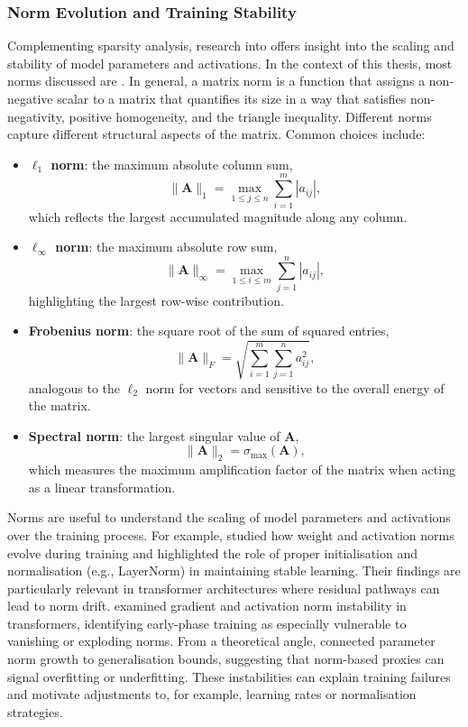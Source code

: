 \subsubsection{Norm Evolution and Training Stability}

Complementing sparsity analysis, research into  offers insight into the scaling and stability of model parameters and activations. In the context of this thesis, most norms discussed are . In general, a matrix norm is a function that assigns a non-negative scalar to a matrix that quantifies its size in a way that satisfies non-negativity, positive homogeneity, and the triangle inequality. Different norms capture different structural aspects of the matrix. Common choices include:

\begin{itemize}
    \item \textbf{$\ell_1$ norm}: the maximum absolute column sum,
    \[
    \|\mathbf{A}\|_1 = \max_{1 \leq j \leq n} \sum_{i=1}^m |a_{ij}|,
    \]
    which reflects the largest accumulated magnitude along any column.
    \item \textbf{$\ell_\infty$ norm}: the maximum absolute row sum,
    \[
    \|\mathbf{A}\|_\infty = \max_{1 \leq i \leq m} \sum_{j=1}^n |a_{ij}|,
    \]
    highlighting the largest row-wise contribution.
    \item \textbf{Frobenius norm}: the square root of the sum of squared entries,
    \[
    \|\mathbf{A}\|_F = \sqrt{\sum_{i=1}^m \sum_{j=1}^n a_{ij}^2},
    \]
    analogous to the $\ell_2$ norm for vectors and sensitive to the overall energy of the matrix.
    \item \textbf{Spectral norm}: the largest singular value of $\mathbf{A}$,
    \[
    \|\mathbf{A}\|_2 = \sigma_{\max}(\mathbf{A}),
    \]
    which measures the maximum amplification factor of the matrix when acting as a linear transformation.
\end{itemize}

Norms are useful to understand the scaling of model parameters and activations over the training process. For example, \citet{mishkin2016goodinit} studied how weight and activation norms evolve during training and highlighted the role of proper initialisation and normalisation (e.g., LayerNorm) in maintaining stable learning. Their findings are particularly relevant in transformer architectures where residual pathways can lead to norm drift. \citet{liu2020understanding} examined gradient and activation norm instability in transformers, identifying early-phase training as especially vulnerable to vanishing or exploding norms. From a theoretical angle, \citet{arora2018theoretical} connected parameter norm growth to generalisation bounds, suggesting that norm-based proxies can signal overfitting or underfitting. These instabilities can explain training failures and motivate adjustments to, for example, learning rates or normalisation strategies. 

